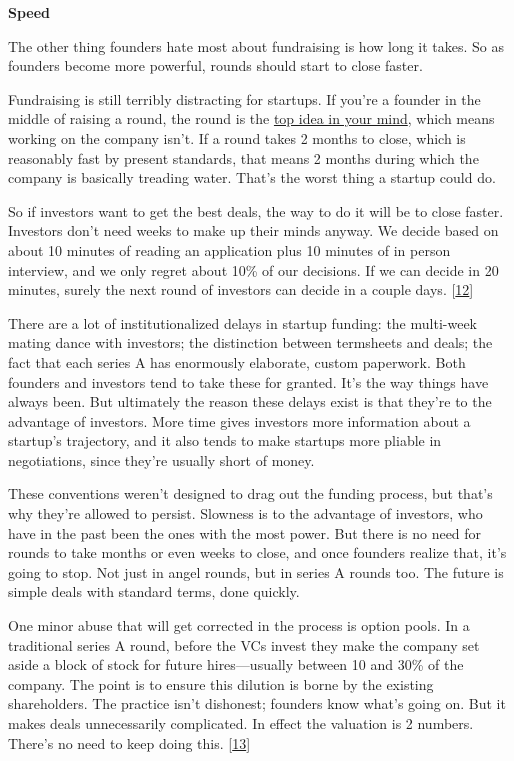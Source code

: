 \textbf{Speed}

The other thing founders hate most about fundraising is how long
it takes.  So as founders become more powerful, rounds should start
to close faster.

Fundraising is still terribly distracting for startups. If you're
a founder in the middle of raising a round, the round is the \href{http://www.paulgraham.com/top.html}{top idea in your mind}, which means working on the
company isn't.  If a round takes 2 months to close, which is
reasonably fast by present standards, that means 2 months during
which the company is basically treading water.  That's the worst
thing a startup could do.

So if investors want to get the best deals, the way to do it will
be to close faster.   Investors don't need weeks to make up their
minds anyway.  We decide based on about 10 minutes of reading an
application plus 10 minutes of in person interview, and we only
regret about 10\% of our decisions.  If we can decide in 20 minutes,
surely the next round of investors can decide in a couple days.
[\href{\#f12n}{12}]

There are a lot of institutionalized delays in startup funding: the
multi-week mating dance with investors; the distinction between
termsheets and deals; the fact that each series A has enormously
elaborate, custom paperwork.  Both founders and investors tend to
take these for granted.  It's the way things have always been.  But
ultimately the reason these delays exist is that they're to the
advantage of investors.  More time gives investors more information
about a startup's trajectory, and it also tends to make startups
more pliable in negotiations, since they're usually short of money.

These conventions weren't designed to drag out the funding process,
but that's why they're allowed to persist.  Slowness is to the
advantage of investors, who have in the past been the ones with the
most power.  But there is no need for rounds to take months or even
weeks to close, and once founders realize that, it's going to stop.
Not just in angel rounds, but in series A rounds too.  The future
is simple deals with standard terms, done quickly.

One minor abuse that will get corrected in the process is option
pools.  In a traditional series A round, before the VCs invest they
make the company set aside a block of stock for future hires---usually
between 10 and 30\% of the company.  The point is to ensure this
dilution is borne by the existing shareholders.  The practice isn't
dishonest; founders know what's going on.  But it makes deals
unnecessarily complicated.  In effect the valuation is 2 numbers.
There's no need to keep doing this.
[\href{\#f13n}{13}]

